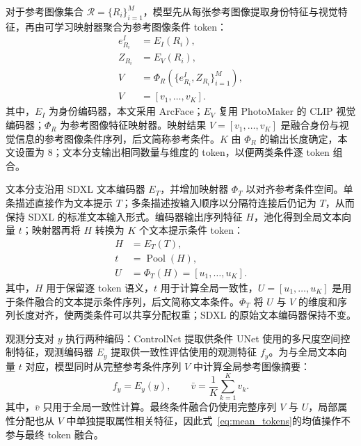 \documentclass[journal]{IEEEtran}
\begin{document}
对于参考图像集合 $\mathcal{R}=\{R_i\}_{i=1}^{M}$，模型先从每张参考图像提取身份特征与视觉特征，再由可学习映射器聚合为参考图像条件 token：
\begin{equation}
\label{eq:reference_tokens}
\begin{aligned}
e^{I}_{R_i}&=E_I(R_i),\\
Z_{R_i}&=E_V(R_i),\\
V&=\Phi_R\!\left(\{e^{I}_{R_i},Z_{R_i}\}_{i=1}^{M}\right),\\
V&=[v_1,\ldots,v_K].
\end{aligned}
\end{equation}
其中，$E_I$ 为身份编码器，本文采用 ArcFace\cite{deng2019arcface}；$E_V$ 复用 PhotoMaker 的 CLIP 视觉编码器\cite{li2024photomaker}；$\Phi_R$ 为参考图像特征映射器。映射结果 $V=[v_1,\ldots,v_K]$ 是融合身份与视觉信息的参考图像条件序列，后文简称参考条件。$K$ 由 $\Phi_R$ 的输出长度确定，本文设置为 8；文本分支输出相同数量与维度的 token，以便两类条件逐 token 组合。

文本分支沿用 SDXL 文本编码器 $E_T$，并增加映射器 $\Phi_T$ 以对齐参考条件空间。单条描述直接作为文本提示 $T$；多条描述按输入顺序以分隔符连接后仍记为 $T$，从而保持 SDXL 的标准文本输入形式。编码器输出序列特征 $H$，池化得到全局文本向量 $t$；映射器再将 $H$ 转换为 $K$ 个文本提示条件 token：
\begin{equation}
\label{eq:text_tokens}
\begin{aligned}
H&=E_T(T),\\
t&=\operatorname{Pool}(H),\\
U&=\Phi_T(H)=[u_1,\ldots,u_K].
\end{aligned}
\end{equation}
其中，$H$ 用于保留逐 token 语义，$t$ 用于计算全局一致性，$U=[u_1,\ldots,u_K]$ 是用于条件融合的文本提示条件序列，后文简称文本条件。$\Phi_T$ 将 $U$ 与 $V$ 的维度和序列长度对齐，使两类条件可以共享分配权重；SDXL 的原始文本编码器保持不变。

观测分支对 $y$ 执行两种编码：ControlNet 提取供条件 UNet 使用的多尺度空间控制特征，观测编码器 $E_y$ 提取供一致性评估使用的观测特征 $f_y$。为与全局文本向量 $t$ 对应，模型同时从完整参考条件序列 $V$ 中计算全局参考图像摘要：
\begin{equation}
\label{eq:mean_tokens}
f_y=E_y(y),\qquad
\bar{v}=\frac{1}{K}\sum_{k=1}^{K}v_k.
\end{equation}
其中，$\bar{v}$ 只用于全局一致性计算。最终条件融合仍使用完整序列 $V$ 与 $U$，局部属性分配也从 $V$ 中单独提取属性相关特征，因此式~\eqref{eq:mean_tokens}的均值操作不参与最终 token 融合。
\end{document}

